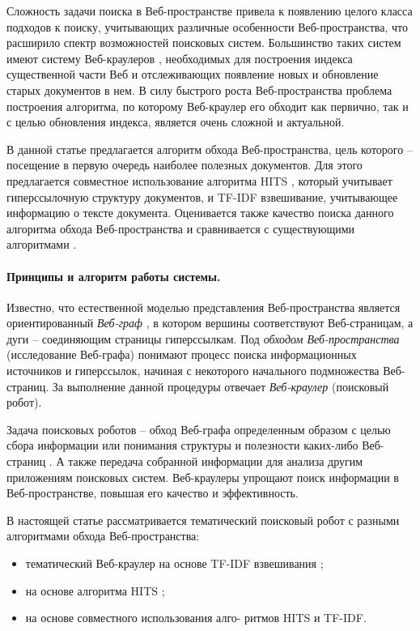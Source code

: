 Сложность задачи поиска в Веб-пространстве привела к появлению целого класса подходов к поиску, учитывающих различные особенности Веб-пространства, что расширило спектр возможностей поисковых систем. Большинство таких систем имеют систему Веб-краулеров \cite{ArasuChoGM}, необходимых для построения индекса существенной части Веб и отслеживающих появление новых и обновление старых документов в нем. В силу быстрого роста Веб-пространства \cite{Kahle,MostReliableHostingCompanySites} проблема построения алгоритма, по которому Веб-краулер его обходит как первично, так и с целью обновления индекса, является очень сложной и актуальной.

В данной статье предлагается алгоритм обхода Веб-пространства, цель которого -- посещение в первую очередь наиболее полезных документов. Для этого предлагается совместное использование алгоритма HITS \cite{Kleinberg}, который учитывает гиперссылочную структуру документов, и TF-IDF \cite{SinghalKaszkiel} взвешивание, учитывающее информацию о тексте документа. Оценивается также качество поиска данного алгоритма обхода Веб-пространства и сравнивается с существующими алгоритмами \cite{BlekanovBondarenko2,Nekrestyanov}.

\paragraph{Принципы и алгоритм работы системы.} Известно, что естественной моделью представления Веб-пространства является ориентированный \textit{Веб-граф} \cite{BroderKumarMaghoul}, в котором вершины соответствуют Веб-страницам, а дуги -- соединяющим страницы гиперссылкам. Под \textit{обходом Веб-пространства} (исследование Веб-графа) понимают процесс поиска информационных источников и гиперссылок, начиная с некоторого начального подмножества Веб-страниц. За выполнение данной процедуры отвечает \textit{Веб-краулер} (поисковый робот).

Задача поисковых роботов -- обход Веб-графа определенным образом с целью сбора информации или понимания структуры и полезности каких-либо Веб-страниц \cite{ArasuChoGM}. А также передача собранной информации для анализа другим приложениям поисковых систем. Веб-краулеры упрощают поиск информации в Веб-пространстве, повышая его качество и эффективность.

В настоящей статье рассматривается тематический поисковый робот с разными алгоритмами обхода Веб-пространства:
\begin{itemize}
	\item тематический Веб-краулер на основе TF-IDF взвешивания \cite{Nekrestyanov};
	\item на основе алгоритма HITS \cite{BlekanovBondarenko2};
	\item на основе совместного использования алго- ритмов HITS и TF-IDF.
\end{itemize}


